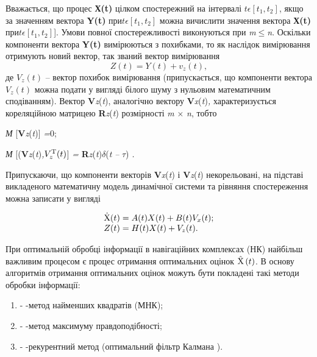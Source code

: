 Вважається, що процес \textbf{Х(t)} цілком спостережний на інтервалі $t \epsilon [t_{1},t_{2}]$,
 якщо за значенням вектора \textbf{Y(t)} при$t \epsilon [t_{1},t_{2}]$ 
можна вичислити значення вектора \textbf{Х(t)} при$t \epsilon [t_{1},t_{2}]$].
Умови повної спостережливості виконуються при \textit{m}$\leq$\textit{n}. Оскільки 
компоненти вектора \textbf{Y(t)} вимірюються з похибками, то як наслідок 
вимірювання отримують новий вектор, так званий вектор вимірювання  
\[ Z(t) = Y(t) + v_{z}(t),\]
де $V_{z}(t)$ --  вектор 
похибок вимірювання (припускається, що компоненти вектора $V_{z}(t)$ 
можна подати у вигляді білого шуму з нульовим математичним сподіванням). Вектор \textbf{V}\textit{z}(\textit{t}), 
аналогічно вектору \textbf{V}\textit{x}(\textit{t})\textit{,} характеризується кореляційною 
матрицею \textbf{R}\textit{z}(\textit{t}) розмірності \textit{m }$\times$\textit{ n}, 
тобто 

\textit{М }[\textbf{V}\textit{z}(\textit{t})]\textit{ =}0; \textit{}

\textit{М }[(\textbf{V}\textit{z}(\textit{t})\textit{,$V_{z}^{{\rm T}} (t)$}]\textit{ = }\textbf{R}\textit{z}(\textit{t})\textbf{$\delta$}(\textit{t} \textit{--} \textit{$\tau$}) \textit{.}

Припускаючи, 
що компоненти векторів \textbf{V}\textit{x}(\textit{t})\textit{ }і \textbf{V}\textit{z}(\textit{t}) 
некорельовані, на підставі викладеного математичну модель динамічної системи та рівняння 
спостереження можна записати у вигляді 

\begin{equation} \label{eq:__11_5_} \begin{array}{l} {\dot{{\rm X} }(t)=A(t)X(t)+B(t)V_{x} 
(t);} \\ {Z(t)=H(t)X(t)+V_{z} (t).} \end{array} \end{equation} 

При оптимальній обробці інформації в навігаційних комплексах (НК) найбільш важливим 
процесом є процес отримання оптимальних оцінок $\hat{{\rm X} }\left(t\right)$. В 
основу алгоритмів отримання оптимальних оцінок можуть бути покладені такі методи 
обробки інформації:

\begin{enumerate}
\item - -метод найменших квадратів (МНК);

\item - -метод максимуму правдоподібності;

\item - -рекурентний метод (оптимальний фільтр  Калмана ).
\end{enumerate}














